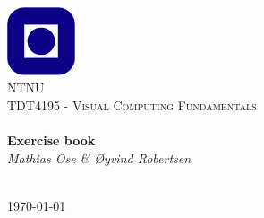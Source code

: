 \begin{titlepage}
\begin{center}
\includegraphics[width=0.15\textwidth]{img/NTNU.png}~\\[1cm]

\textsc{\LARGE NTNU}\\[1.5cm]

\textsc{\Large TDT4195 - Visual Computing Fundamentals}\\[0.5cm]

\HRule \\[0.4cm]
{ \huge \bfseries Exercise book}\\[0.5cm]
{\large \textit{Mathias Ose \& Øyvind Robertsen}}\\[0.2cm]
\HRule \\[1.5cm]



\vfill

{\large \today}
\end{center}
\end{titlepage}
